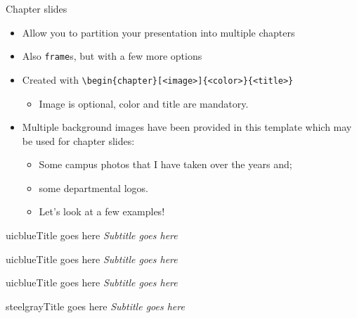 \documentclass{beamer}
\begin{document}
\begin{frame}[fragile]{Chapter slides}
\begin{itemize}
\item Allow you to partition your presentation into multiple chapters
\item Also \verb|frame|s, but with a few more options
\item Created with \verb|\begin{chapter}[<image>]{<color>}{<title>}|
  \begin{itemize}
  \item Image is optional, color and title are mandatory.
  \end{itemize}
\item Multiple background images have been provided in this template which may be used for chapter slides:
  \begin{itemize}
  \item Some campus photos that I have taken over the years and;
  \item some departmental logos.
  \item Let's look at a few examples!
  \end{itemize}
\end{itemize}
\end{frame}


\begin{chapter}{uicblue}{Title goes here}
\textit{Subtitle goes here}
\end{chapter}

\begin{chapter}{uicblue}{Title goes here}
\textit{Subtitle goes here}
\end{chapter}

\begin{chapter}{uicblue}{Title goes here}
\textit{Subtitle goes here}
\end{chapter}

\begin{chapter}{steelgray}{Title goes here}
\textit{Subtitle goes here}
\end{chapter}
\end{document}
